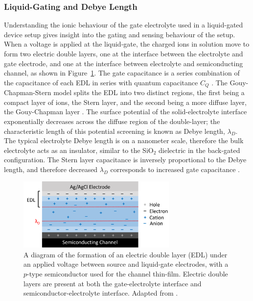 \documentclass[
  a4paper,
]{scrbook}
\begin{document}
\hypertarget{liquid-gating-and-debye-length}{%
\subsubsection*{Liquid-Gating and Debye
Length}\label{liquid-gating-and-debye-length}}

Understanding the ionic behaviour of the gate electrolyte used in a
liquid-gated device setup gives insight into the gating and sensing
behaviour of the setup. When a voltage is applied at the liquid-gate,
the charged ions in solution move to form two electric double layers,
one at the interface between the electrolyte and gate electrode, and one
at the interface between electrolyte and semiconducting channel, as
shown in Figure~\ref{fig-Debye-length}. The gate capacitance is a series
combination of the capacitance of each EDL in series with quantum
capacitance \(C_{Q}\) \autocite{Heller2010,Kireev2017,Shkodra2021}. The
Gouy-Chapman-Stern model splits the EDL into two distinct regions, the
first being a compact layer of ions, the Stern layer, and the second
being a more diffuse layer, the Gouy-Chapman layer
\autocite{Tiwari2022}. The surface potential of the solid-electrolyte
interface exponentially decreases across the diffuse region of the
double-layer; the characteristic length of this potential screening is
known as Debye length, \(\lambda_D\). The typical electrolyte Debye
length is on a nanometer scale, therefore the bulk electrolyte acts as
an insulator, similar to the SiO\(_2\) dielectric in the back-gated
configuration. The Stern layer capacitance is inversely proportional to
the Debye length, and therefore decreased \(\lambda_D\) corresponds to
increased gate capacitance
\autocite{Heller2010,Ohno2015,Shkodra2021,Yao2021}.

\begin{figure}

{\centering \includegraphics[width=0.7\textwidth,height=\textheight]{figures/ch2/Debye-length-schematic-alt.png}

}

\caption{\label{fig-Debye-length}A diagram of the formation of an
electric double layer (EDL) under an applied voltage between source and
liquid-gate electrodes, with a \(p\)-type semiconductor used for the
channel thin-film. Electric double layers are present at both the
gate-electrolyte interface and semiconductor-electrolyte interface.
Adapted from \autocite{Ohno2015,Shkodra2021,Tiwari2022}.}

\end{figure}
\end{document}
